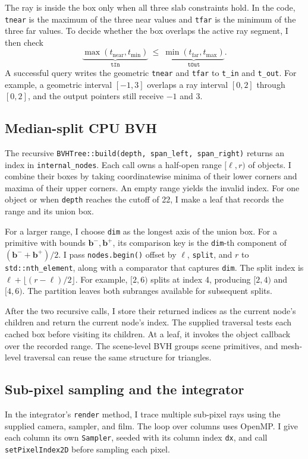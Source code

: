 \documentclass[acmtog]{acmart}
\begin{document}
The ray is inside the box only when all three slab constraints hold. In the code, \texttt{tnear} is the maximum of the three near values and \texttt{tfar} is the minimum of the three far values. To decide whether the box overlaps the active ray segment, I then check
\begin{equation}
\underbrace{\max(t_{\mathrm{near}},t_{\min})}_{\texttt{tIn}}
\ \leq\
\underbrace{\min(t_{\mathrm{far}},t_{\max})}_{\texttt{tOut}} .
\end{equation}
A successful query writes the geometric \texttt{tnear} and \texttt{tfar} to \texttt{t\_in} and \texttt{t\_out}. For example, a geometric interval $[-1,3]$ overlaps a ray interval $[0,2]$ through $[0,2]$, and the output pointers still receive $-1$ and $3$.

\subsection{Median-split CPU BVH}
The recursive \texttt{BVHTree::build(depth, span\_left, span\_right)} returns an index in \texttt{internal\_nodes}. Each call owns a half-open range $[\ell,r)$ of objects. I combine their boxes by taking coordinatewise minima of their lower corners and maxima of their upper corners. An empty range yields the invalid index. For one object or when \texttt{depth} reaches the cutoff of 22, I make a leaf that records the range and its union box.

For a larger range, I choose \texttt{dim} as the longest axis of the union box. For a primitive with bounds $\mathbf b^-,\mathbf b^+$, its comparison key is the \texttt{dim}-th component of $(\mathbf b^-+\mathbf b^+)/2$. I pass \texttt{nodes.begin()} offset by $\ell$, \texttt{split}, and $r$ to \texttt{std::nth\_element}, along with a comparator that captures \texttt{dim}. The split index is $\ell+\lfloor(r-\ell)/2\rfloor$. For example, $[2,6)$ splits at index 4, producing $[2,4)$ and $[4,6)$. The partition leaves both subranges available for subsequent splits.

After the two recursive calls, I store their returned indices as the current node's children and return the current node's index. The supplied traversal tests each cached box before visiting its children. At a leaf, it invokes the object callback over the recorded range. The scene-level BVH groups scene primitives, and mesh-level traversal can reuse the same structure for triangles.

\subsection{Sub-pixel sampling and the integrator}
In the integrator's \texttt{render} method, I trace multiple sub-pixel rays using the supplied camera, sampler, and film. The loop over columns uses OpenMP. I give each column its own \texttt{Sampler}, seeded with its column index \texttt{dx}, and call \texttt{setPixelIndex2D} before sampling each pixel.
\end{document}
